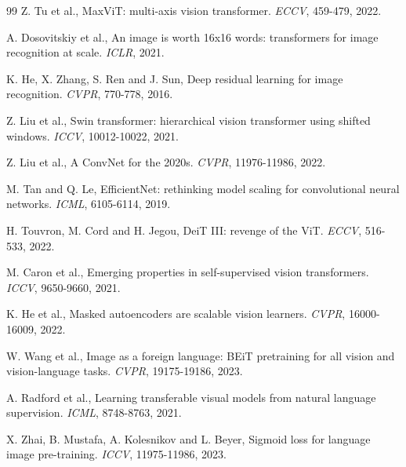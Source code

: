 \documentclass{esannV2}
\begin{document}
\begin{footnotesize}
\begin{thebibliography}{99}
 Z. Tu et al., MaxViT: multi-axis vision transformer. \emph{ECCV}, 459-479, 2022.

 A. Dosovitskiy et al., An image is worth 16x16 words: transformers for image recognition at scale. \emph{ICLR}, 2021.

 K. He, X. Zhang, S. Ren and J. Sun, Deep residual learning for image recognition. \emph{CVPR}, 770-778, 2016.

 Z. Liu et al., Swin transformer: hierarchical vision transformer using shifted windows. \emph{ICCV}, 10012-10022, 2021.

 Z. Liu et al., A ConvNet for the 2020s. \emph{CVPR}, 11976-11986, 2022.

 M. Tan and Q. Le, EfficientNet: rethinking model scaling for convolutional neural networks. \emph{ICML}, 6105-6114, 2019.

 H. Touvron, M. Cord and H. Jegou, DeiT III: revenge of the ViT. \emph{ECCV}, 516-533, 2022.

 M. Caron et al., Emerging properties in self-supervised vision transformers. \emph{ICCV}, 9650-9660, 2021.

 K. He et al., Masked autoencoders are scalable vision learners. \emph{CVPR}, 16000-16009, 2022.

 W. Wang et al., Image as a foreign language: BEiT pretraining for all vision and vision-language tasks. \emph{CVPR}, 19175-19186, 2023.

 A. Radford et al., Learning transferable visual models from natural language supervision. \emph{ICML}, 8748-8763, 2021.

 X. Zhai, B. Mustafa, A. Kolesnikov and L. Beyer, Sigmoid loss for language image pre-training. \emph{ICCV}, 11975-11986, 2023.

\end{thebibliography}
\end{footnotesize}
\end{document}
